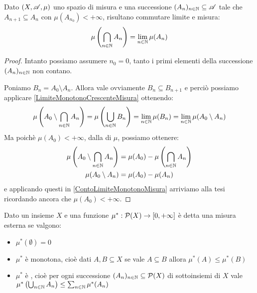 \begin{corollary}\label{LimiteMonotonoDecrescenteMisura}
	Dato $(X,\mathscr A,\mu)$ uno spazio di misura e una successione $(A_n)_{n\in\mathbb N}\subseteq \mathscr A$ tale che $A_{n+1}\subseteq A_n$ con $\mu(A_{n_0})<+\infty$, risultano commutare limite e misura:
	\begin{equation*}
		\mu\left(\bigcap_{n\in\mathbb N} A_n\right)=\lim_{n\in\mathbb N} \mu(A_n)
	\end{equation*}
\end{corollary}
\begin{proof}
	Intanto possiamo assumere $n_0=0$, tanto i primi elementi della successione $(A_n)_{n\in\mathbb N}$ non contano.
	
	Poniamo $B_n=A_0\setminus A_n$. Allora vale ovviamente $B_n\subseteq B_{n+1}$ e perciò possiamo applicare \cref{LimiteMonotonoCrescenteMisura} ottenendo:
	\begin{equation}\label{ContoLimiteMonotonoMisura}
		\mu\left(A_0\setminus\bigcap_{n\in\mathbb N}A_n\right)=\mu\left(\bigcup_{n\in\mathbb N}B_n\right)=\lim_{n\in\mathbb N}\mu(B_n)
		=\lim_{n\in\mathbb N}\mu(A_0\setminus A_n)
	\end{equation}
	Ma poichè $\mu(A_0)<+\infty$, dalla \sigadd[ità] di $\mu$, possiamo ottenere:
	\begin{align*}
		\mu\left(A_0\setminus\bigcap_{n\in\mathbb N}A_n\right)&=\mu(A_0)-\mu\left(\bigcap_{n\in\mathbb N}A_n\right)\\
		\mu(A_0\setminus A_n)&=\mu(A_0)-\mu(A_n)
	\end{align*}
	e applicando questi in \cref{ContoLimiteMonotonoMisura} arriviamo alla tesi ricordando ancora che $\mu(A_0)<+\infty$.
	
\end{proof}



\begin{definition}
	Dato un insieme $X$ e una funzione $\mu^*:\mathcal P(X)\to [0,+\infty]$ è detta una misura esterna se valgono:
	\begin{itemize}
		\item $\mu^*(\emptyset)=0$
		\item $\mu^*$ è monotona, cioè dati $A,B\subseteq X$ se vale $A\subseteq B$ allora $\mu^*(A)\le \mu^*(B)$
		\item $\mu^*$ è \sigsubadd{}, cioè  per ogni successione $(A_n)_{n\in\mathbb N}\subseteq \mathcal P(X)$ di sottoinsiemi di $X$ vale $\mu^*\left(\bigcup_{n\in\mathbb{N}}A_n\right)\le \sum_{n\in\mathbb N} \mu^*(A_n)$
	\end{itemize}
\end{definition}

